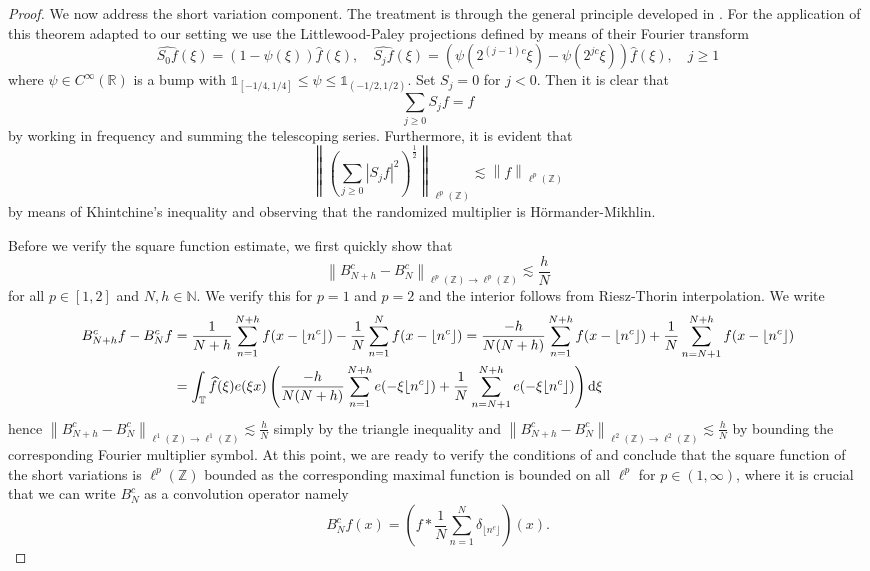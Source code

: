 \documentclass[10pt,leqno]{amsart}
\def\d{{\rm d}}
\def\R {\mathbb{R}}
\def\N {\mathbb{N}}
\def\Z {{\mathbb Z}}
\numberwithin{equation}{section}
\numberwithin{counter2}{section}
\theoremstyle{definition}
\theoremstyle{plain}
\newcommand{\TT}{\mathbb{ T} }
\newcommand{\ind}[1]{\mathds{1}_{{#1}}}
\newcommand{\floor}[1]{\lfloor #1 \rfloor}
\begin{document}
\begin{proof}
        We now address the short variation component. The treatment is through the general principle developed in \cite[Theorem 2.39]{MSZ20}. For the application of this theorem adapted to our setting we use the Littlewood-Paley projections defined by means of their Fourier transform \[ \widehat{S_0f}(\xi)=\left(1-\psi(\xi)\right)\widehat{f}(\xi), \quad  \widehat{S_jf}(\xi)= \left(\psi(2^{(j-1)c}\xi)-\psi(2^{jc}\xi)\right)\widehat{f}(\xi), \quad j \geq 1 \]  where $\psi \in C^{\infty}(\R)$ is a bump with $ \ind{[-1/4,1/4]} \leq \psi \leq \ind{(-1/2,1/2)}.$ Set $S_j=0$ for $j<0$. Then it is clear that \[ \sum_{j  \geq 0} S_jf=f \] by working in frequency and summing the telescoping series. Furthermore, it is evident that \[ \left \| \left( \sum_{j \geq 0}|S_jf|^2 \right)^{\frac{1}{2}} \right \|_{\ell^p(\Z)} \lesssim \left \| f \right \|_{\ell^p(\Z)} \] by means of Khintchine's inequality and observing that the randomized multiplier is H\"{o}rmander-Mikhlin. 
        
        Before we verify the square function estimate, we first quickly show that \[ \left \| B_{N+h}^{c}-B_N^{c} \right \|_{\ell^p(\Z) \to \ell^p(\Z)} \lesssim \frac{h}{N} \]  for all $p\in[1,2]$ and $N,h\in\N$. We verify this for $p=1$ and $p=2$ and the interior follows from Riesz-Thorin interpolation. We write \[ \begin{split}
			B_{N+h}^{c} f-B_N^{c} f&= \frac{1}{N+h} \sum_{n=1}^{N+h}f(x-\floor{n^c})-\frac{1}{N} \sum_{n=1}^Nf(x-\floor{n^c})= \frac{-h}{N(N+h)} \sum_{n=1}^{N+h}f(x-\floor{n^c})+\frac{1}{N} \sum_{n=N+1}^{N+h}f(x-\floor{n^c}) \\ &  = \int_{\TT} \widehat{f}(\xi)e(\xi x) \left( \frac{-h}{N(N+h)} \sum_{n=1}^{N+h}e(-\xi \floor{n^c})+\frac{1}{N} \sum_{n=N+1}^{N+h} e(-\xi \floor{n^c})  \right) \d \xi 
		\end{split} \] hence $\left \| B_{N+h}^{c}-B_N^{c} \right \|_{\ell^1(\Z) \to \ell^1(\Z)} \lesssim \frac{h}{N}$ simply by the triangle inequality and $\left \| B_{N+h}^{c}-B_N^{c}\right \|_{\ell^2(\Z) \to \ell^2(\Z)} \lesssim \frac{h}{N}$ by bounding the corresponding Fourier multiplier symbol. At this point, we are ready to verify the conditions of \cite[Theorem 2.39]{MSZ20} and conclude that the square function of the short variations is $\ell^p(\Z)$ bounded as the corresponding maximal function is bounded on all $\ell^p$ for $p \in (1,\infty)$, where it is crucial that we can write $B_N^{c}$ as a convolution operator namely \[ B_N^{c} f(x)= \left(f* \frac{1}{N} \sum_{n=1}^N \delta_{\floor{n^c}} \right)(x). \] 
        

\end{proof}
\end{document}
